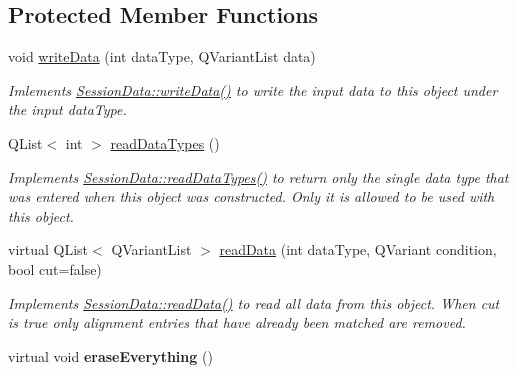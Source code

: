 \subsection*{Protected Member Functions}
\begin{DoxyCompactItemize}
\item 
void \hyperlink{class_align_session_data_ab2e598eae6d62d0fb26dae4ba8fbcb74}{write\-Data} (int data\-Type, Q\-Variant\-List data)
\begin{DoxyCompactList}\small\item\em Imlements \hyperlink{class_session_data_ad05a594d8410d638f1a066bfa5a10ba3}{Session\-Data\-::write\-Data()} to write the input data to this object under the input data\-Type. \end{DoxyCompactList}\item 
\hypertarget{class_align_session_data_a06d69e9ddd59ad7503a1294677f1663c}{Q\-List$<$ int $>$ \hyperlink{class_align_session_data_a06d69e9ddd59ad7503a1294677f1663c}{read\-Data\-Types} ()}\label{class_align_session_data_a06d69e9ddd59ad7503a1294677f1663c}

\begin{DoxyCompactList}\small\item\em Implements \hyperlink{class_session_data_a4b879f10ecfbfcaa12c2dbbc1b15bdff}{Session\-Data\-::read\-Data\-Types()} to return only the single data type that was entered when this object was constructed. Only it is allowed to be used with this object. \end{DoxyCompactList}\item 
virtual Q\-List$<$ Q\-Variant\-List $>$ \hyperlink{class_align_session_data_a88815e5e509175a5a7c1851a9a012c88}{read\-Data} (int data\-Type, Q\-Variant condition, bool cut=false)
\begin{DoxyCompactList}\small\item\em Implements \hyperlink{class_session_data_a81f4eb49b8a23eb9c1a1575abc2fad4c}{Session\-Data\-::read\-Data()} to read all data from this object. When cut is true only alignment entries that have already been matched are removed. \end{DoxyCompactList}\item 
\hypertarget{class_align_session_data_af7128f57df567bd85c3982d4a847cefe}{virtual void {\bfseries erase\-Everything} ()}\label{class_align_session_data_af7128f57df567bd85c3982d4a847cefe}

\end{DoxyCompactItemize}
